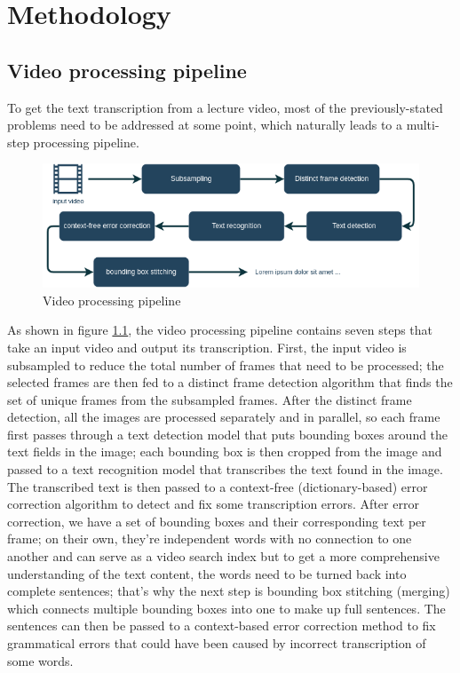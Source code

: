 \chapter{Methodology}

\section{Video processing pipeline}

To get the text transcription from a lecture video, most of the previously-stated problems need to be addressed at some point, which naturally leads to a multi-step processing pipeline.

\begin{figure}[H]
        \centering
        \includegraphics[width=140mm]{figures/ocr_pipeline}
        \caption{Video processing pipeline}
        \label{meth:ocr_pipeline}
\end{figure}

As shown in figure \ref{meth:ocr_pipeline}, the video processing pipeline contains seven steps that take an input video and output its transcription. First, the input video is subsampled to reduce the total number of frames that need to be processed; the selected frames are then fed to a distinct frame detection algorithm that finds the set of unique frames from the subsampled frames. After the distinct frame detection, all the images are processed separately and in parallel, so each frame first passes through a text detection model that puts bounding boxes around the text fields in the image; each bounding box is then cropped from the image and passed to a text recognition model that transcribes the text found in the image. The transcribed text is then passed to a context-free (dictionary-based) error correction algorithm to detect and fix some transcription errors. After error correction, we have a set of bounding boxes and their corresponding text per frame; on their own, they're independent words with no connection to one another and can serve as a video search index but to get a more comprehensive understanding of the text content, the words need to be turned back into complete sentences; that's why the next step is bounding box stitching (merging) which connects multiple bounding boxes into one to make up full sentences. The sentences can then be passed to a context-based error correction method to fix grammatical errors that could have been caused by incorrect transcription of some words.

